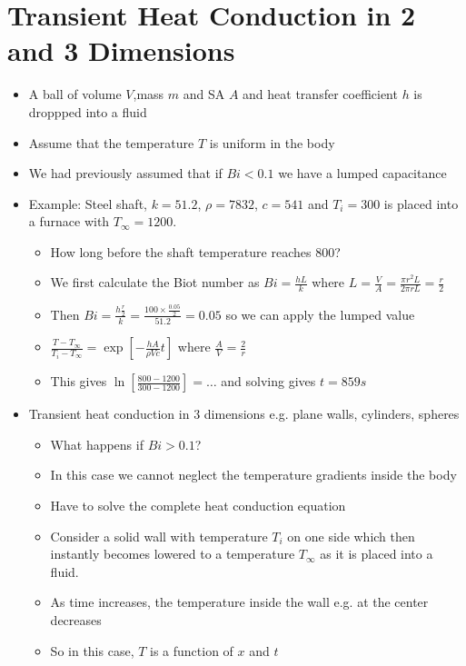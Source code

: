 \documentclass[12pt]{article}
\begin{document}
\section {Transient Heat Conduction in 2 and 3 Dimensions}
\begin{itemize}
    \item A ball of volume $V$,mass $m$ and SA $A$ and heat transfer coefficient $h$ is droppped into a fluid
    \item Assume that the temperature $T$ is uniform in the body
    \item We had previously assumed that if $Bi < 0.1$ we have a lumped capacitance
    \item Example: Steel shaft, $k = 51.2$, $\rho = 7832$, $c = 541$ and $T_i = 300$ is placed into a furnace with $T_{\infty} = 1200$. \begin{itemize}
        \item How long before the shaft temperature reaches 800?
        \item We first calculate the Biot number as $Bi = \frac{hL}{k}$ where $L = \frac{V}{A} = \frac{\pi r^2 L}{2 \pi r L} = \frac{r}{2}$
        \item Then $Bi = \frac{h \frac{r}{2}}{k} = \frac{100 \times \frac{0.05}{2}}{51.2} = 0.05$ so we can apply the lumped value
        \item $\frac{T - T_{\infty}}{T_i - T_{\infty}} = \exp \left[ - \frac{hA}{\rho V c} t \right]$ where $\frac{A}{V} = \frac{2}{r}$
        \item This gives $\ln \left[ \frac{800-1200}{300-1200} \right] = \dots $ and solving gives $t = 859 s$
    \end{itemize}
    \item Transient heat conduction in 3 dimensions e.g. plane walls, cylinders, spheres \begin{itemize}
        \item What happens if $Bi > 0.1$? 
        \item In this case we cannot neglect the temperature gradients inside the body
        \item Have to solve the complete heat conduction equation
        \item Consider a solid wall with temperature $T_i$ on one side which then instantly becomes lowered to a temperature $T_{\infty}$ as it is placed into a fluid. 
        \item As time increases, the temperature inside the wall e.g. at the center decreases
        \item So in this case, $T$ is a function of $x$ and $t$

\end{itemize}
\end{itemize}
\end{document}
